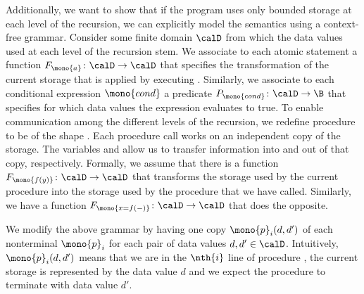 \documentclass[../../diss.tex]{subfiles}
\begin{document}
Additionally, we want to show that if the program uses only bounded storage at each level of the recursion, we can explicitly model the semantics using a context-free grammar.
Consider some finite domain $\domain$ from which the data values used at each level of the recursion stem.
We associate to each atomic statement  a function $F_{\mono{a}} \colon \domain \to \domain$ that specifies the transformation of the current storage that is applied by executing .
Similarly, we associate to each conditional expression $\mono{cond}$ a predicate $P_{\mono{cond}} \colon \domain \to \B$ that specifies for which data values the expression evaluates to true.
To enable communication among the different levels of the recursion, we redefine procedure to be of the shape .
Each procedure call works on an independent copy of the storage.
The variables  and  allow us to transfer information into and out of that copy, respectively.
Formally, we assume that there is a function $F_{\mono{f(y)}} \colon \domain \to \domain$ that transforms the storage used by the current procedure into the storage used by the procedure  that we have called.
Similarly, we have a function $F_{\mono{x = f(-)}} \colon \domain \to \domain$ that does the opposite.

We modify the above grammar by having one copy $\mono{p}_{i}(d,d')$ of each nonterminal $\mono{p}_{i}$ for each pair of data values $d,d' \in \domain$.
Intuitively, $\mono{p}_{i}(d,d')$ means that we are in the $\nth{i}$ line of procedure , the current storage is represented by the data value $d$ and we expect the procedure to terminate with data value $d'$.
\end{document}
